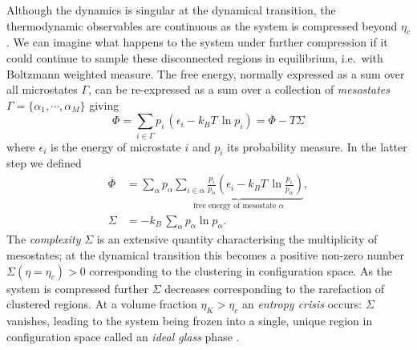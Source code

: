 \documentclass[11pt,twoside]{report}
\begin{document}
Although the dynamics is singular at the dynamical transition, the thermodynamic observables are continuous as the system is compressed beyond $\eta_c$ \cite{ParisiRMP2010}.
We can imagine what happens to the system under further compression if it could continue to sample these disconnected regions in equilibrium, i.e.\ with Boltzmann weighted measure.
The free energy, normally expressed as a sum over all microstates%
$\Gamma$, can be re-expressed as a sum over a collection of \emph{mesostates} $\Gamma = \{\alpha_1, \cdots, \alpha_M\}$ giving
\begin{equation}
    \Phi = \sum_{i \in \Gamma} p_i \, (\epsilon_i - k_B T \, \ln{p_i})
    = \overline{\Phi} - T \Sigma
\end{equation}
where $\epsilon_i$ is the energy of microstate $i$ and $p_i$ its probability measure.
In the latter step we defined%
\begin{subequations}
  \begin{align}
    \overline{\Phi}
    &=
    \sum_\alpha p_\alpha
    \underbrace{
      \sum_{i \in \alpha} \frac{p_i}{p_\alpha}
      \left(
      \epsilon_i - k_B T \, \ln{\frac{p_i}{p_\alpha}}
      \right)
    }_\textrm{free energy of mesostate $\alpha$},
    \\
    \Sigma &= - k_B \, \sum_\alpha p_\alpha \ln{p_\alpha}.
  \end{align}
\end{subequations}
The \emph{complexity} $\Sigma$ is an extensive quantity characterising the multiplicity of mesostates; at the dynamical transition this becomes a positive non-zero number $\Sigma(\eta = \eta_c) > 0$ corresponding to the clustering in configuration space.
As the system is compressed further $\Sigma$ decreases \cite{KirkpatrickPRB1987,KirkpatrickPRA1989,ParisiRMP2010} corresponding to the rarefaction of clustered regions.
At a volume fraction $\eta_K > \eta_c$ an \emph{entropy crisis} occurs: $\Sigma$ vanishes, leading to the system being frozen into a single, unique region in configuration space called an \emph{ideal glass} phase \cite{KauzmannCR1948,KirkpatrickPRB1987,HallJCP1987,KirkpatrickPRA1989,ParisiRMP2010,BerthierRMP2011}.
\end{document}
